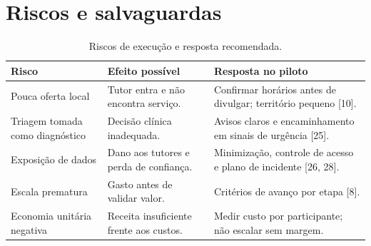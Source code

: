 \section{Riscos e salvaguardas}

\begin{table}[H]
\centering\small
\caption{Riscos de execução e resposta recomendada.}
\begin{tabularx}{\textwidth}{P{3.0cm}YY}
\toprule
\textbf{Risco} & \textbf{Efeito possível} & \textbf{Resposta no piloto} \\
\midrule
Pouca oferta local & Tutor entra e não encontra serviço. & Confirmar horários antes de divulgar; território pequeno [10]. \\
Triagem tomada como diagnóstico & Decisão clínica inadequada. & Avisos claros e encaminhamento em sinais de urgência [25]. \\
Exposição de dados & Dano aos tutores e perda de confiança. & Minimização, controle de acesso e plano de incidente [26, 28]. \\
Escala prematura & Gasto antes de validar valor. & Critérios de avanço por etapa [8]. \\
Economia unitária negativa & Receita insuficiente frente aos custos. & Medir custo por participante; não escalar sem margem. \\
\bottomrule
\end{tabularx}
\end{table}
